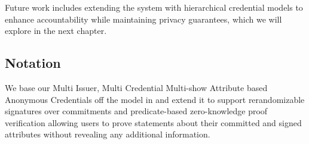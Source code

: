 Future work includes extending the system with hierarchical credential models to enhance accountability while maintaining privacy guarantees, which we will explore in the next chapter.

























\subsection{Notation}
We base our Multi Issuer, Multi Credential Multi-show Attribute based Anonymous Credentials off the model in \cite{fuchsbauer_structure-preserving_2019} and extend it to support rerandomizable signatures over commitments and predicate-based zero-knowledge proof verification allowing users to prove statements about their committed and signed attributes without revealing any additional information.

